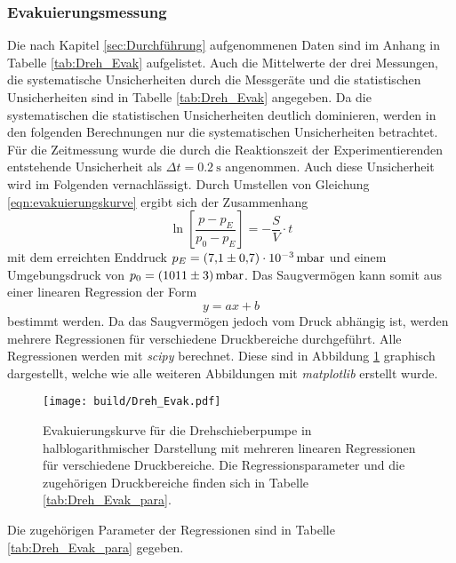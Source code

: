 \subsubsection{Evakuierungsmessung}
Die nach Kapitel \ref{sec:Durchführung} aufgenommenen Daten sind im Anhang in Tabelle \ref{tab:Dreh_Evak}
aufgelistet. Auch die Mittelwerte der drei Messungen, die systematische Unsicherheiten durch die 
Messgeräte und die statistischen Unsicherheiten sind in Tabelle \ref{tab:Dreh_Evak} angegeben. 
Da die systematischen die statistischen Unsicherheiten deutlich dominieren, werden in den 
folgenden Berechnungen nur die systematischen Unsicherheiten betrachtet. Für die Zeitmessung 
wurde die durch die Reaktionszeit der Experimentierenden entstehende Unsicherheit als 
$\Delta t=\SI{0.2}{\second}$ angenommen. Auch diese Unsicherheit wird im Folgenden vernachlässigt.
Durch Umstellen von Gleichung \ref{eqn:evakuierungskurve} ergibt sich der Zusammenhang
\begin{equation*}
  \ln{\left[\frac{p-p_E}{p_0-p_E}\right]}=-\frac{S}{V}\cdot t
\end{equation*}
mit dem erreichten Enddruck ${p_E=\SI{7.1\pm 0.7 e-3}{\milli\bar}}$ und einem Umgebungsdruck
von ${p_0=\SI{1011 \pm 3}{\milli\bar}}$. 
Das Saugvermögen kann somit aus einer linearen Regression der Form 
\begin{equation}
  y=ax+b
  \label{eqn:gerade}
\end{equation}
bestimmt werden. Da das Saugvermögen jedoch vom Druck abhängig ist, werden mehrere 
Regressionen für verschiedene Druckbereiche durchgeführt. Alle Regressionen werden 
mit \textit{scipy} \cite{scipy} berechnet. Diese sind in Abbildung 
\ref{fig:dreh_evak} graphisch dargestellt, welche wie alle weiteren Abbildungen 
mit \textit{matplotlib} \cite{matplotlib} erstellt wurde.
\begin{figure}[H]
    \centering
    \texttt{[image: build/Dreh\_Evak.pdf]}
    \caption{Evakuierungskurve für die Drehschieberpumpe in halblogarithmischer Darstellung mit mehreren linearen Regressionen für verschiedene Druckbereiche. Die Regressionsparameter und die zugehörigen Druckbereiche finden sich in Tabelle \ref{tab:Dreh_Evak_para}.}
    \label{fig:dreh_evak}
\end{figure}
\noindent
Die zugehörigen Parameter der Regressionen sind in Tabelle \ref{tab:Dreh_Evak_para} gegeben.
